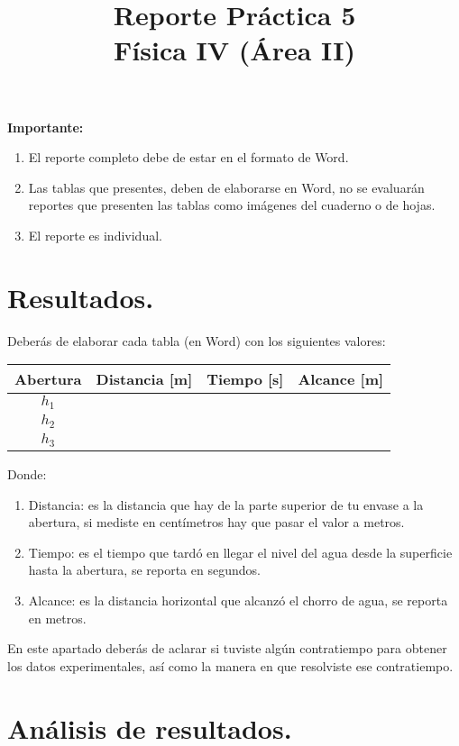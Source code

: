 \documentclass[14pt]{extarticle}
\title{\vspace*{-2cm} Reporte Práctica 5 \\  Física IV (Área II) \vspace{-5ex}}
\date{}
\begin{document}
\maketitle

\textbf{Importante:}
\begin{enumerate}
\item El reporte completo debe de estar en el formato de Word.
\item Las tablas que presentes, deben de elaborarse en Word, no se evaluarán reportes que presenten las tablas como imágenes del cuaderno o de hojas.
\item El reporte es individual.
\end{enumerate}

\section{Resultados.}

Deberás de elaborar cada tabla (en Word) con los siguientes valores:
\begin{table}[H]
\centering
\begin{tabular}{| c | c | c | c |} \hline
Abertura & Distancia [m] & Tiempo [s] & Alcance [m] \\ \hline
$h_{1}$ & & & \\ \hline
$h_{2}$ & & & \\ \hline
$h_{3}$ & & & \\ \hline    
\end{tabular}
\end{table}
Donde:
\begin{enumerate}
\item Distancia: es la distancia que hay de la parte superior de tu envase a la abertura, si mediste en centímetros hay que pasar el valor a metros.
\item Tiempo: es el tiempo que tardó en llegar el nivel del agua desde la superficie hasta la abertura, se reporta en segundos.
\item Alcance: es la distancia horizontal que alcanzó el chorro de agua, se reporta en metros.
\end{enumerate}

En este apartado deberás de aclarar si tuviste algún contratiempo para obtener los datos experimentales, así como la manera en que resolviste ese contratiempo.

\section{Análisis de resultados.}
\end{document}
